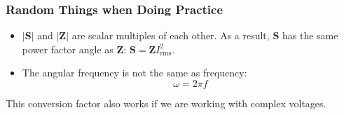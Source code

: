 \documentclass{article}
\begin{document}
\subsubsection{Random Things when Doing Practice}
\begin{itemize}
    \item $|\bm{S}|$ and $|\bm{Z}|$ are scalar multiples of each other. As a result, $\bm{S}$ has the same power factor angle as $\bm{Z}$: $\bm{S}=\bm{Z}I_\text{rms}^2$.
    \item The angular frequency is not the same as frequency:
    \begin{equation}
        \omega = 2\pi f
    \end{equation}
\end{itemize}
This conversion factor also works if we are working with complex voltages.
\end{document}
